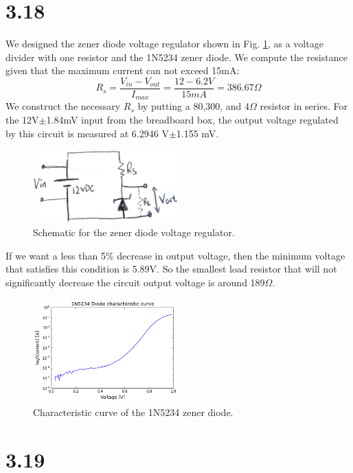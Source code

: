 \documentclass[authoryear, 12pt,5p, times]{elsarticle}
\begin{document}
\section*{3.18}
We designed the zener diode voltage regulator shown in Fig. \ref{3_18_schematic}, as a voltage divider with one resistor and the 1N5234 zener diode. We compute the resistance given that the maximum current can not exceed 15mA:
\begin{equation}
R_s = \frac{V_{in}-V_{out}}{I_{max}}=\frac{12-6.2 V}{15mA} =386.67\Omega
\end{equation}
We construct the necessary $R_s$ by putting a 80,300, and 4$\Omega$ resistor in series. For the 12V$\pm$1.84mV input from the breadboard box, the output voltage regulated by this circuit is measured at 6.2946 V$\pm$1.155 mV.
\begin{figure}[h!]
\center
\includegraphics[width=0.5\textwidth]{figure/3_18_schematic}
\caption{Schematic for the zener diode voltage regulator.}
\label{3_18_schematic}
\end{figure}
If we want a less than 5\% decrease in output voltage, then the minimum voltage that satisfies this condition is 5.89V. So the smallest load resistor that will not significantly decrease the circuit output voltage is around 189$\Omega$. 
\begin{figure}[h!]
\center
\includegraphics[width=0.5\textwidth]{figure/3_18_curve}
\caption{Characteristic curve of the 1N5234 zener diode. }
\label{3_18_curve}
\end{figure}
\section*{3.19}
\end{document}
